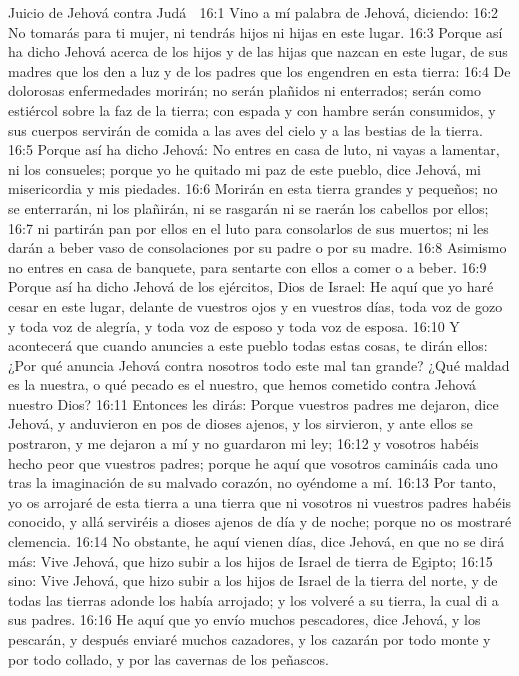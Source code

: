 Juicio de Jehová contra Judá  

16:1 Vino a mí palabra de Jehová, diciendo:  
16:2 No tomarás para ti mujer, ni tendrás hijos ni hijas en este lugar.  
16:3 Porque así ha dicho Jehová acerca de los hijos y de las hijas que nazcan en este lugar, de sus madres que los den a luz y de los padres que los engendren en esta tierra:  
16:4 De dolorosas enfermedades morirán; no serán plañidos ni enterrados; serán como estiércol sobre la faz de la tierra; con espada y con hambre serán consumidos, y sus cuerpos servirán de comida a las aves del cielo y a las bestias de la tierra.  
16:5 Porque así ha dicho Jehová: No entres en casa de luto, ni vayas a lamentar, ni los consueles; porque yo he quitado mi paz de este pueblo, dice Jehová, mi misericordia y mis piedades.  
16:6 Morirán en esta tierra grandes y pequeños; no se enterrarán, ni los plañirán, ni se rasgarán ni se raerán los cabellos por ellos;  
16:7 ni partirán pan por ellos en el luto para consolarlos de sus muertos; ni les darán a beber vaso de consolaciones por su padre o por su madre.  
16:8 Asimismo no entres en casa de banquete, para sentarte con ellos a comer o a beber.  
16:9 Porque así ha dicho Jehová de los ejércitos, Dios de Israel: He aquí que yo haré cesar en este lugar, delante de vuestros ojos y en vuestros días, toda voz de gozo y toda voz de alegría, y toda voz de esposo y toda voz de esposa.  
16:10 Y acontecerá que cuando anuncies a este pueblo todas estas cosas, te dirán ellos: ¿Por qué anuncia Jehová contra nosotros todo este mal tan grande? ¿Qué maldad es la nuestra, o qué pecado es el nuestro, que hemos cometido contra Jehová nuestro Dios?  
16:11 Entonces les dirás: Porque vuestros padres me dejaron, dice Jehová, y anduvieron en pos de dioses ajenos, y los sirvieron, y ante ellos se postraron, y me dejaron a mí y no guardaron mi ley;  
16:12 y vosotros habéis hecho peor que vuestros padres; porque he aquí que vosotros camináis cada uno tras la imaginación de su malvado corazón, no oyéndome a mí.  
16:13 Por tanto, yo os arrojaré de esta tierra a una tierra que ni vosotros ni vuestros padres habéis conocido, y allá serviréis a dioses ajenos de día y de noche; porque no os mostraré clemencia.  
16:14 No obstante, he aquí vienen días, dice Jehová, en que no se dirá más: Vive Jehová, que hizo subir a los hijos de Israel de tierra de Egipto; 
16:15 sino: Vive Jehová, que hizo subir a los hijos de Israel de la tierra del norte, y de todas las tierras adonde los había arrojado; y los volveré a su tierra, la cual di a sus padres.  
16:16 He aquí que yo envío muchos pescadores, dice Jehová, y los pescarán, y después enviaré muchos cazadores, y los cazarán por todo monte y por todo collado, y por las cavernas de los peñascos.  
